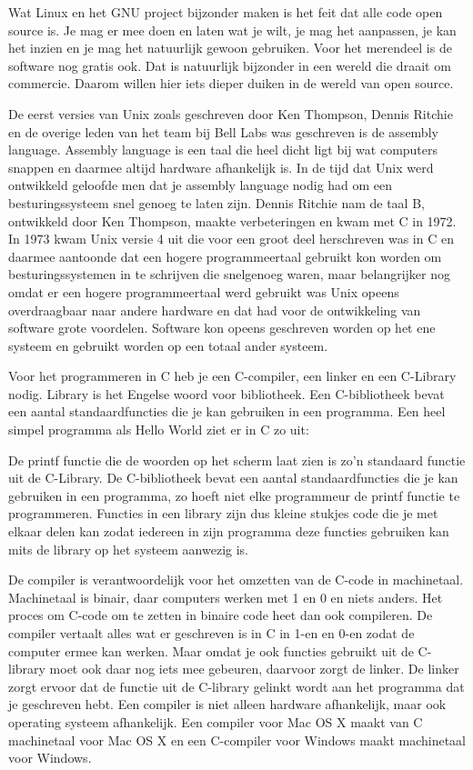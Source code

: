 Wat Linux en het GNU project bijzonder maken is het feit dat alle code open source is. Je mag er mee doen en laten wat
je wilt, je mag het aanpassen, je kan het inzien en je mag het natuurlijk gewoon gebruiken. Voor het merendeel is de software nog gratis ook. Dat is
natuurlijk bijzonder in een wereld die draait om commercie. Daarom willen hier iets dieper duiken in de wereld van open source.

De eerst versies van Unix zoals geschreven door Ken Thompson, Dennis Ritchie en de overige leden
van het team bij Bell Labs was geschreven is de assembly language. Assembly language is een taal die heel dicht ligt bij
wat computers snappen en daarmee altijd hardware afhankelijk is. In de tijd dat Unix werd ontwikkeld geloofde men dat je
assembly language nodig had om een besturingssysteem snel genoeg te laten zijn. Dennis Ritchie nam de taal B, ontwikkeld
door Ken Thompson, maakte verbeteringen en kwam met C in
1972. In 1973 kwam Unix versie 4 uit die voor een groot deel herschreven was in C en daarmee aantoonde dat een hogere
programmeertaal gebruikt kon worden om besturingssystemen in te schrijven die snelgenoeg waren, maar belangrijker nog omdat er een hogere
programmeertaal werd gebruikt was Unix opeens overdraagbaar naar andere hardware en dat had voor de ontwikkeling van software grote voordelen. Software kon opeens geschreven worden op het ene systeem en gebruikt worden op een totaal ander systeem.

Voor het programmeren in C heb je een C-compiler, een linker en een C-Library nodig. Library is het Engelse woord voor
bibliotheek. Een C-bibliotheek bevat een aantal standaardfuncties die je kan gebruiken in een programma.
Een heel simpel programma als Hello World ziet er in C zo uit:



De printf functie die de woorden  op het scherm laat zien is zo'n standaard functie uit de C-Library.
 De C-bibliotheek bevat een aantal standaardfuncties die je kan gebruiken in een programma, zo hoeft niet
elke programmeur de printf functie te programmeren. Functies in een library zijn dus kleine stukjes code die je met elkaar delen kan zodat iedereen in zijn programma deze functies gebruiken kan mits de library op het systeem aanwezig is.

De compiler is verantwoordelijk voor het omzetten van de C-code in machinetaal. Machinetaal is binair, daar computers werken met 1 en 0 en niets anders.
Het proces om C-code om te zetten in binaire code heet dan ook compileren. De compiler vertaalt alles wat er geschreven is in C in 1-en en 0-en zodat de computer ermee kan werken. Maar omdat je ook functies gebruikt uit de C-library moet ook daar nog iets mee gebeuren, daarvoor zorgt de linker. De linker zorgt ervoor dat de functie uit de C-library gelinkt wordt aan het programma dat je geschreven hebt. Een compiler is niet alleen hardware afhankelijk, maar ook operating systeem afhankelijk. Een compiler voor Mac OS X maakt van C machinetaal voor Mac OS X en een C-compiler voor Windows maakt machinetaal voor Windows.

